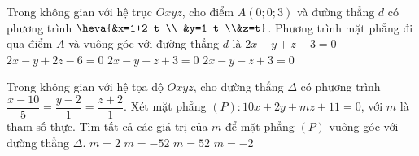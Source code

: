 \begin{ex}%
	Trong không gian với hệ trục $Oxyz$, cho điểm $A(0;0;3)$ và đường thẳng $d$ có phương trình $ \heva{&x=1+2 t \\ &y=1-t \\&z=t}$. Phương trình mặt phẳng đi qua điểm $A$ và vuông góc với đường thẳng $d$ là
	\choice
		{\True $2x-y+z-3=0$}
		{$2x-y+2 z-6=0$}
		{$2x-y+z+3=0$}
		{$2x-y-z+3=0$}
\end{ex}

\begin{ex}%
	Trong không gian với hệ tọa độ $Oxyz$, cho đường thẳng $\Delta$ có phương trình $\dfrac{x-10}{5}=\dfrac{y-2}{1}=\dfrac{z+2}{1}$. Xét mặt phẳng $(P)\colon 10x+2y+m z+11=0$, với $m$ là tham số thực. Tìm tất cả các giá trị của $m$ để mặt phẳng $(P)$ vuông góc với đường thẳng $\Delta$.
	\choice 
		{\True $m=2$}
		{$m=-52$}
		{$m=52$}
		{$m=-2$}
\end{ex}

